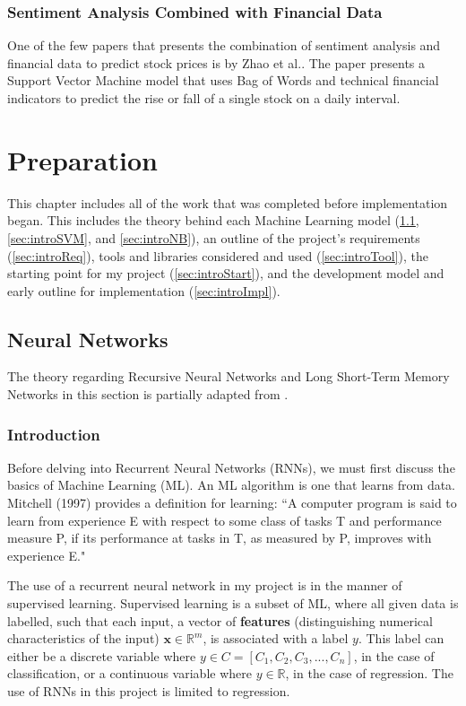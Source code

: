 \documentclass[12pt,a4paper,twoside,openright]{report}
\renewcommand{\vec}[1]{\mathbf{#1}}
\newcommand{\R}{\mathbb{R}}
\begin{document}
\subsection{Sentiment Analysis Combined with Financial Data}

One of the few papers that presents the combination of sentiment analysis and financial data to predict stock
prices is by Zhao et al.\cite{Zhai07}. The paper presents a Support Vector Machine model that uses Bag of Words
and technical financial indicators to predict the rise or fall of a single stock on a daily interval.

\chapter{Preparation}
\label{sec:prep}

This chapter includes all of the work that was completed before implementation began.
This includes the theory behind each Machine Learning model (\cref{sec:introNN},
\cref{sec:introSVM}, and \cref{sec:introNB}), 
an outline of the project's requirements (\cref{sec:introReq}), tools and libraries
considered and used (\cref{sec:introTool}), the starting point
for my project (\cref{sec:introStart}), and the development model and
early outline for implementation (\cref{sec:introImpl}).

\section{Neural Networks}
\label{sec:introNN}

The theory regarding Recursive Neural Networks and
Long Short-Term Memory Networks in this section is partially adapted from \cite{Goodfellow-et-al-2016,
Hochreiter97, Gers99, Graves13}.

\subsection{Introduction}

Before delving into Recurrent Neural Networks (RNNs), we must first discuss
the basics of Machine Learning (ML). An ML algorithm is one that learns from
data. Mitchell (1997) provides a definition for learning:
``A computer program is said to learn from experience E with respect to some
class of tasks T and performance measure P, if its performance at tasks in T, as
measured by P, improves with experience E."\cite{Mitchell97} 

The use of a recurrent neural network in my project is in the manner of
supervised learning. Supervised learning is a subset of ML,
where all given data is labelled, such that each input, a vector of \textbf{features} (distinguishing
numerical characteristics of the input) $\vec{x} \in \R^m$,
is associated with a label $y$. This label can either be a discrete variable where 
$y \in C = [C_1, C_2, C_3, ..., C_n]$,
in the case of classification, or a continuous variable where $y \in \R$, in the case of regression.
The use of RNNs in this project is limited to regression.
\end{document}
